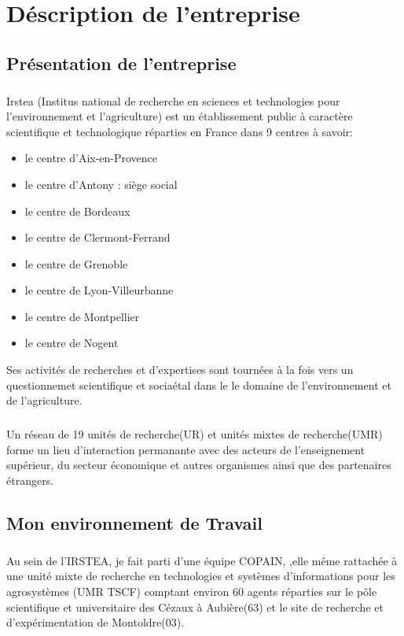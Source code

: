 \chapter{Déscription de l'entreprise}
\section{Présentation de l'entreprise}
\paragraph{}
Irstea (Institus national de recherche en sciences et technologies pour l'environnement et l'agriculture) est un établissement public à caractère scientifique  et technologique réparties en France dans 9 centres à savoir:  
\begin{itemize}
 \item le centre d'Aix-en-Provence
 \item le centre d'Antony : siège social
 \item le centre de Bordeaux
 \item le centre de Clermont-Ferrand
 \item le centre de Grenoble
 \item le centre de Lyon-Villeurbanne
 \item le centre de Montpellier
 \item le centre de Nogent
\end{itemize}

Ses activités de recherches et d'expertises sont tournées à la fois vers un questionnemet scientifique et sociaétal dans le le domaine de l'environnement et de l'agriculture. 

\paragraph{}
Un réseau de 19 unités de recherche(UR) et unités mixtes de recherche(UMR) forme un lieu d'interaction permanante avec des acteurs de l'enseignement supérieur, du secteur économique et autres organismes ainsi que des partenaires étrangers.

\section{Mon environnement de Travail}
\paragraph{}
Au sein de l'IRSTEA, je fait parti d'une équipe COPAIN, ,elle même rattachée à une unité mixte de recherche en technologies et systèmes d'informations pour les agrosystèmes (UMR TSCF) comptant environ 60 agents  réparties sur le pôle scientifique et universitaire des Cézaux à Aubière(63) et le site de recherche et d'expérimentation de Montoldre(03).
